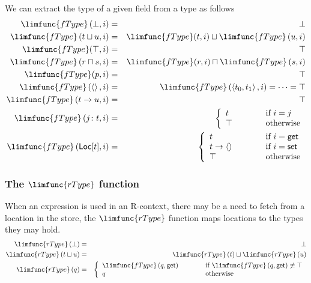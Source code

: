 \documentclass[12pt]{article}
\begin{document}
We can extract the type of a given field from a type as follows%
\begin{eqnarray*}
\limfunc{fType}\left( \bot ,i\right)  &=&\bot  \\
\limfunc{fType}\left( t\sqcup u,i\right)  &=&\limfunc{fType}(t,i)\sqcup 
\limfunc{fType}\left( u,i\right)  \\
\limfunc{fType}(\top ,i) &=&\top  \\
\limfunc{fType}\left( r\sqcap s,i\right)  &=&\limfunc{fType}(r,i)\sqcap 
\limfunc{fType}\left( s,i\right)  \\
\limfunc{fType}(p,i) &=&\top  \\
\limfunc{fType}\left( \left\langle {}\right\rangle ,i\right)  &=&\limfunc{%
fType}\left( \left\langle t_{0},t_{1}\right\rangle ,i\right) =\cdots =\top 
\\
\limfunc{fType}\left( t\rightarrow u,i\right)  &=&\top  \\
\limfunc{fType}\left( j\colon t,i\right)  &=&\left\{ 
\begin{array}{lll}
t & \qquad  & \text{if }i=j \\ 
\top  &  & \text{otherwise}%
\end{array}%
\right.  \\
\limfunc{fType}\left( \mathsf{Loc}[t],i\right)  &=&\left\{ 
\begin{array}{lll}
t & \qquad  & \text{if }i=\mathsf{get} \\ 
t\rightarrow \left\langle {}\right\rangle  &  & \text{if }i=\mathsf{set} \\ 
\top  &  & \text{otherwise}%
\end{array}%
\right. 
\end{eqnarray*}

\subsubsection{The $\limfunc{rType}$ function}

When an expression is used in an R-context, there may be a need to fetch
from a location in the store, the $\limfunc{rType}$ function maps locations
to the types they may hold.%
\begin{eqnarray*}
\limfunc{rType}\left( \bot \right)  &=&\bot  \\
\limfunc{rType}\left( t\sqcup u\right)  &=&\limfunc{rType}\left( t\right)
\sqcup \limfunc{rType}\left( u\right)  \\
\limfunc{rType}\left( q\right)  &=&\left\{ 
\begin{array}{lll}
\limfunc{fType}\left( q,\mathsf{get}\right)  & \qquad  & \text{if }\limfunc{%
fType}\left( q,\mathsf{get}\right) \not\equiv \top  \\ 
q &  & \text{otherwise}%
\end{array}%
\right. 
\end{eqnarray*}
\end{document}
